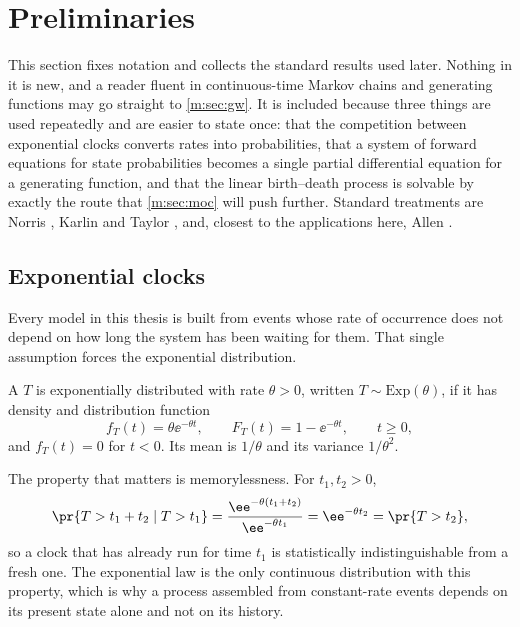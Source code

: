 \section{Preliminaries}
\label{m:sec:prelim}

This section fixes notation and collects the standard results used later. Nothing
in it is new, and a reader fluent in continuous-time Markov chains and generating
functions may go straight to \cref{m:sec:gw}. It is included because three things are
used repeatedly and are easier to state once: that the competition between
exponential clocks converts rates into probabilities, that a system of forward
equations for state probabilities becomes a single partial differential equation
for a generating function, and that the linear birth--death process is solvable by
exactly the route that \cref{m:sec:moc} will push further. Standard treatments are
Norris \cite{Norris1997}, Karlin and Taylor \cite{KarlinTaylor1975}, and, closest to
the applications here, Allen \cite{Allen2010}.

\subsection{Exponential clocks}
\label{m:sec:exp}

Every model in this thesis is built from events whose rate of occurrence does not
depend on how long the system has been waiting for them. That single assumption
forces the exponential distribution.

\begin{definition}
\label{m:def:exp}
A \rv{} $T$ is exponentially distributed with rate $\theta>0$, written
$T\sim\mathrm{Exp}(\theta)$, if it has density and distribution function
\begin{equation*}
f_T(t) = \theta\ee^{-\theta t},
\qquad
F_T(t) = 1-\ee^{-\theta t},
\qquad t\ge0,
\end{equation*}
and $f_T(t)=0$ for $t<0$. Its mean is $1/\theta$ and its variance $1/\theta^2$.
\end{definition}

The property that matters is memorylessness. For $t_1,t_2>0$,
\begin{equation}
\label{m:eq:memoryless}
\pr{T > t_1+t_2 \mid T > t_1}
= \frac{\ee^{-\theta(t_1+t_2)}}{\ee^{-\theta t_1}}
= \ee^{-\theta t_2}
= \pr{T > t_2},
\end{equation}
so a clock that has already run for time $t_1$ is statistically indistinguishable
from a fresh one. The exponential law is the only continuous distribution with this
property, which is why a process assembled from constant-rate events depends on its
present state alone and not on its history.

